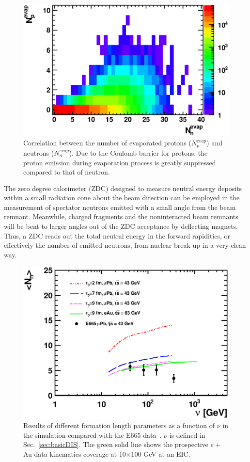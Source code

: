 \begin{figure}
\begin{center}
\includegraphics[width=0.7\columnwidth,keepaspectratio]{plots/chpt7/evap_protonVsneutron.eps}
\caption[Correlation between the number of protons ($N^{evap}_{p}$) and neutrons ($N^{evap}_{n}$) during evaporation processes]{Correlation between the number of evaporated protons ($N^{evap}_{p}$) and neutrons ($N^{evap}_{n}$). Due
to the Coulomb barrier for protons, the proton emission during
evaporation process is greatly suppressed compared to that of neutron.}
\label{fig:evapNeutronVsProton}
\end{center}
\end{figure}

The zero degree calorimeter (ZDC) designed to measure neutral energy deposits
within a small radiation cone about the beam direction can be employed in the
measurement of spectator neutrons emitted with a small angle from the beam
remnant. Meanwhile, charged fragments and the noninteracted
beam remnants will be bent to larger angles out of the ZDC acceptance by
deflecting magnets. Thus, a ZDC reads out the total
neutral energy in the forward rapidities, or effectively the number of
emitted neutrons, from nuclear break up in a very clean way.

\begin{figure}
\begin{center}
\includegraphics[width=0.7\columnwidth,keepaspectratio]{plots/chpt7/tau_comparison.eps}
\caption[Average neutron number from evaporation processes versus $\nu$ compared to the E665 measurement]{Results of different formation length parameters as a function of $\nu$ in the simulation compared with the E665 data~\cite{Adams:1995nu}. $\nu$ is defined in Sec.~\ref{sec:basicDIS}. The green solid line shows the prospective $e+$Au data kinematics coverage at 10$\times$100 GeV at an EIC.}
\label{fig:tauCompare}
\end{center}
\end{figure}

